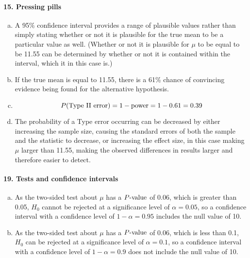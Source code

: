 \documentclass[../Homework]{subfiles}
\begin{document}
		\paragraph{15. Pressing pills}
			\begin{enumerate}[a.]
				\item	
					A 95\% confidence interval provides a range of plausible values rather than simply stating whether or not it is plausible for the true mean to be a particular value as well. (Whether or not it is plausible for $\mu$ to be equal to be 11.55 can be determined by whether or not it is contained within the interval, which it in this case is.)
				\item
					If the true mean is equal to 11.55, there is a 61\% chance of convincing evidence being found for the alternative hypothesis.
				\item
					\[P(\text{Type \Roman{2} error}) = 1 - \text{power} = 1 - 0.61 = 0.39\]
				\item
					The probability of a Type  error occurring can be decreased by either increasing the sample size, causing the standard errors of both the sample and the statistic to decrease, or increasing the effect size, in this case making $\mu$ larger than 11.55, making the observed differences in results larger and therefore easier to detect.
			\end{enumerate}
		\paragraph{19. Tests and confidence intervals}
			\begin{enumerate}[a.]
				\item
					As the two-sided test about $\mu$ has a $P\text{-value}$ of 0.06, which is greater than 0.05, $H_0$ cannot be rejected at a significance level of $\alpha = 0.05$, so a confidence interval with a confidence level of $1 - \alpha = 0.95$ includes the null value of 10.
				\item
					As the two-sided test about $\mu$ has a $P\text{-value}$ of 0.06, which is less than 0.1, $H_0$ can be rejected at a significance level of $\alpha = 0.1$, so a confidence interval with a confidence level of $1 - \alpha = 0.9$ does not include the null value of 10.
			\end{enumerate}
\end{document}
